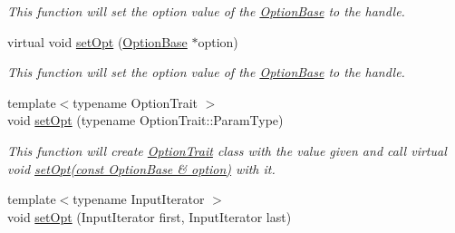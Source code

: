 \begin{DoxyCompactItemize}
\begin{DoxyCompactList}\small\item\em This function will set the option value of the \hyperlink{classcurlpp_1_1OptionBase}{Option\-Base} to the handle. \end{DoxyCompactList}\item 
virtual void \hyperlink{classcurlpp_1_1Easy_a64b45db88ad188cf25398b4ead5f13a5}{set\-Opt} (\hyperlink{classcurlpp_1_1OptionBase}{Option\-Base} $\ast$option)
\begin{DoxyCompactList}\small\item\em This function will set the option value of the \hyperlink{classcurlpp_1_1OptionBase}{Option\-Base} to the handle. \end{DoxyCompactList}\item 
\hypertarget{classcurlpp_1_1Easy_aa3b2f0c550d270403be29ad05f93e3b0}{{\footnotesize template$<$typename Option\-Trait $>$ }\\void \hyperlink{classcurlpp_1_1Easy_aa3b2f0c550d270403be29ad05f93e3b0}{set\-Opt} (typename Option\-Trait\-::\-Param\-Type)}\label{classcurlpp_1_1Easy_aa3b2f0c550d270403be29ad05f93e3b0}

\begin{DoxyCompactList}\small\item\em This function will create \hyperlink{classcurlpp_1_1OptionTrait}{Option\-Trait} class with the value given and call virtual void \hyperlink{classcurlpp_1_1Easy_ae5b79592f7f01fab768f0dd733188e3b}{set\-Opt(const Option\-Base \& option)} with it. \end{DoxyCompactList}\item 
\hypertarget{classcurlpp_1_1Easy_a627196122ee249d379302bc86b569e9b}{{\footnotesize template$<$typename Input\-Iterator $>$ }\\void \hyperlink{classcurlpp_1_1Easy_a627196122ee249d379302bc86b569e9b}{set\-Opt} (Input\-Iterator first, Input\-Iterator last)}\label{classcurlpp_1_1Easy_a627196122ee249d379302bc86b569e9b}


\end{DoxyCompactItemize}

